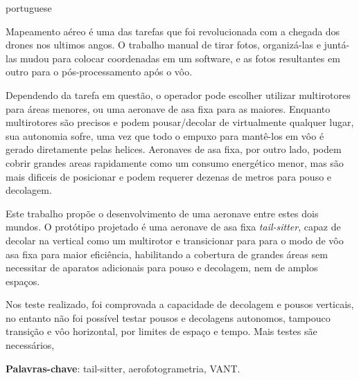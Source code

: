 
\setlength{\absparsep}{18pt} %
\begin{resumo}[Resumo]
 \begin{otherlanguage*}{portuguese}

Mapeamento aéreo é uma das tarefas que foi revolucionada com a chegada dos drones nos ultimos angos.
%
O trabalho manual de tirar fotos, organizá-las e juntá-las mudou para colocar coordenadas em um software, e as fotos resultantes em outro para o pós-processamento após o vôo.
%

Dependendo da tarefa em questão, o operador pode escolher utilizar multirotores para áreas menores, ou uma aeronave de asa fixa para as maiores.
%
Enquanto multirotores são precisos e podem pousar/decolar de virtualmente qualquer lugar, sua autonomia sofre, uma vez que todo o empuxo para mantê-los em vôo é gerado diretamente pelas helices.
%
Aeronaves de asa fixa, por outro lado, podem cobrir grandes areas rapidamente como um consumo energético menor, mas são mais dificeis de posicionar e podem requerer dezenas de metros para pouso e decolagem.

%
Este trabalho propõe o desenvolvimento de uma aeronave entre estes dois mundos.
%
O protótipo projetado é uma aeronave de asa fixa \textit{tail-sitter}, capaz de decolar na vertical como um multirotor e transicionar para para o modo de vôo asa fixa para maior eficiência, habilitando a cobertura de grandes áreas sem necessitar de aparatos adicionais para pouso e decolagem, nem de amplos espaços.
%

Nos teste realizado, foi comprovada a capacidade de decolagem e pousos verticais, no entanto não foi possível testar pousos e decolagens autonomos, tampouco transição e vôo horizontal, por limites de espaço e tempo. Mais testes sãe necessários,
%


 \textbf{Palavras-chave}: tail-sitter, aerofotogrametria, VANT.
  \end{otherlanguage*}
\end{resumo}

